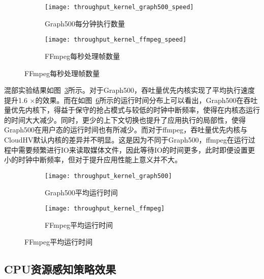 \begin{figure}[H]
    \centering
    \begin{subfigure}[b]{0.35\textwidth}
        \texttt{[image: throughput\_kernel\_graph500\_speed]}
        \caption{\quad Graph500每分钟执行数量}
        \label{fig:throughput_kernel_graph500_speed}
    \end{subfigure}
    \begin{subfigure}[b]{0.35\textwidth}
        \texttt{[image: throughput\_kernel\_ffmpeg\_speed]}
        \caption{\quad FFmpeg每秒处理帧数量}
        \label{fig:throughput_kernel_ffmpeg_speed}
    \end{subfigure}
    \label{fig:perf_throughput}
\end{figure}

混部实验结果如图~\ref{fig:perf_throughput}所示。对于Graph500，吞吐量优先内核实现了平均执行速度提升1.6 $\times$的效果。而在如图~\ref{fig:perf_throughput_time}所示的运行时间分布上可以看出，Graph500在吞吐量优先内核下，得益于保守的抢占模式与较低的时钟中断频率，使得在内核态运行的时间大大减少。同时，更少的上下文切换也提升了应用执行的局部性，使得Graph500在用户态的运行时间也有所减少。而对于ffmpeg，吞吐量优先内核与CloudHV默认内核的差异并不明显。这是因为不同于Graph500，ffmpeg在运行过程中需要频繁进行IO来读取媒体文件，因此等待IO的时间更多，此时即便设置更小的时钟中断频率，但对于提升应用性能上意义并不大。

\begin{figure}[H]
    \centering
    \begin{subfigure}[b]{0.35\textwidth}
        \texttt{[image: throughput\_kernel\_graph500]}
        \caption{\quad Graph500平均运行时间}
        \label{fig:throughput_kernel_graph500}
    \end{subfigure}
    \begin{subfigure}[b]{0.35\textwidth}
        \texttt{[image: throughput\_kernel\_ffmpeg]}
        \caption{\quad FFmpeg平均运行时间}
        \label{fig:throughput_kernel_ffmpeg}
    \end{subfigure}
    \label{fig:perf_throughput_time}
\end{figure}

\subsection{CPU资源感知策略效果}

